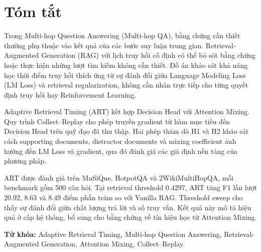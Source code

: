 \chapter*{Tóm tắt}
Trong Multi-hop Question Answering (Multi-hop QA), bằng chứng cần thiết thường phụ thuộc vào kết quả của các bước suy luận trung gian. Retrieval-Augmented Generation (RAG) với lịch truy hồi cố định có thể bỏ sót bằng chứng hoặc thực hiện những lượt tìm kiếm không cần thiết. Đồ án khảo sát khả năng học thời điểm truy hồi thích ứng từ sự đánh đổi giữa Language Modeling Loss (LM Loss) và retrieval regularization, không cần nhãn trực tiếp cho từng quyết định truy hồi hay Reinforcement Learning.

Adaptive Retrieval Timing (ART) kết hợp Decision Head với Attention Mixing. Quy trình Collect--Replay cho phép truyền gradient từ hàm mục tiêu đến Decision Head trên quỹ đạo đã thu thập. Hai phép thăm dò H1 và H2 khảo sát cách supporting documents, distractor documents và mixing coefficient ảnh hưởng đến LM Loss và gradient, qua đó đánh giá các giả định nền tảng của phương pháp.

ART được đánh giá trên MuSiQue, HotpotQA và 2WikiMultiHopQA, mỗi benchmark gồm 500 câu hỏi. Tại retrieval threshold \(0.4297\), ART tăng F1 lần lượt \(20.92\), \(8.63\) và \(8.49\) điểm phần trăm so với Vanilla RAG. Threshold sweep cho thấy sự đánh đổi giữa chất lượng trả lời và số truy vấn. Kết quả này mô tả hiệu quả ở cấp hệ thống, bổ sung cho bằng chứng về tín hiệu học từ Attention Mixing.

\medskip\noindent\textbf{Từ khóa:} Adaptive Retrieval Timing, Multi-hop Question Answering, Retrieval-Augmented Generation, Attention Mixing, Collect--Replay.
